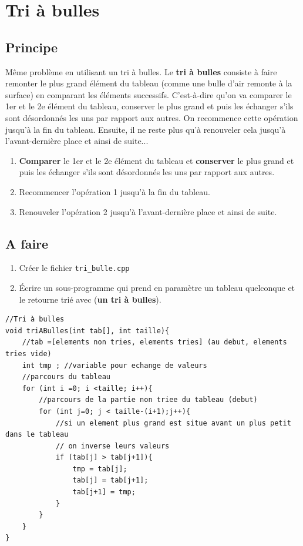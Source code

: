 \documentclass[french]{article}
\begin{document}
\section{Tri à bulles}

\subsection*{Principe}
Même problème en utilisant un tri à bulles. Le \textbf{tri à bulles} consiste à faire remonter le plus grand élément du tableau (comme une bulle d'air remonte à la surface) en comparant les éléments successifs. C'est-à-dire qu'on va comparer le 1er et le 2e élément du tableau, conserver le plus grand et puis les échanger s'ils sont désordonnés les uns par rapport aux autres. On recommence cette opération jusqu'à la fin du tableau. Ensuite, il ne reste plus qu'à renouveler cela jusqu'à l'avant-dernière place et ainsi de suite...

\begin{enumerate}
	\item \textbf{Comparer} le 1er et le 2e élément du tableau et \textbf{conserver} le plus grand et puis les échanger s'ils sont désordonnés les uns par rapport aux autres.
	\item Recommencer l'opération 1 jusqu'à la fin du tableau.
	\item Renouveler l'opération 2 jusqu'à l'avant-dernière place et ainsi de suite.
\end{enumerate} 
\subsection*{A faire}
\begin{enumerate}
\item Créer le fichier \texttt{tri\_bulle.cpp}
\item Écrire un sous-programme qui prend en paramètre un tableau quelconque et le retourne trié avec (\textbf{un tri à bulles}).
\end{enumerate}

\begin{lstlisting}[caption={Tri à bulles}]
//Tri à bulles
void triABulles(int tab[], int taille){
    //tab =[elements non tries, elements tries] (au debut, elements tries vide)
    int tmp ; //variable pour echange de valeurs
    //parcours du tableau
    for (int i =0; i <taille; i++){
        //parcours de la partie non triee du tableau (debut)
        for (int j=0; j < taille-(i+1);j++){
            //si un element plus grand est situe avant un plus petit dans le tableau
            // on inverse leurs valeurs
            if (tab[j] > tab[j+1]){
                tmp = tab[j];
                tab[j] = tab[j+1];
                tab[j+1] = tmp;
            }
        }
    }
}
\end{lstlisting}

	
\end{document}
